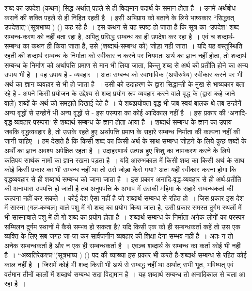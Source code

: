 शब्द का उपदेश (कथन) सिद्ध अर्थात् पहले से ही विद्यमान पदार्थ के समान होता है~। उनमें अर्थबोध करानें की शक्ति पहले से ही निहित रहती है~। इसी अभिप्राय को बताने के लिये भाष्यकार “सिद्धवत् उपदेशात्”(सूत्रभाष्य ) () कह रहे है~। इस कथन से यह स्पष्ट हो जाता है कि सूत्र का ‘उपदेश' शब्द सम्बन्ध-करण को नहीं बता रहा है, अपितु प्रसिद्ध सम्बन्ध का ही उपदेश कर रहा है~। एवं च शब्दार्थ-सम्बन्ध का कथन ही किया जाता है, उसे (शब्दार्थ-सम्बन्ध को) जोड़ा नही जाता~। यदि यह वस्तुस्थिति रहती की शब्दार्थ सम्बन्ध के निर्माता को स्वीकार न करने पर नियमतः अर्थ का ज्ञान नहीं होता, तो शब्दार्थ सम्बन्ध के निर्माण को अर्थापत्ति प्रमाण से मान भी लिया जाता, किन्तु शब्द से अर्थ की प्रतीति होने का अन्य उपाय भी है~। वह उपाय है - व्यवहार~। अतः सम्बन्ध को स्वाभाविक (अपौरुषेय) स्वीकार करने पर भी अर्थ का ज्ञान व्यवहार से भी हो जाता है~। उसी को उदाहरण के द्वारा सिद्धान्ती के मुख से भाष्यकार बता रहे है - अपने किसी प्रयोजन के उद्देश्य से शब्द प्रयोग रूप व्यवहार करने वाले वृद्ध के (द्वारा कहे जाने वाले) शब्दों के अर्थ को समझते दिखाई देते है~। ये शब्दप्रयोक्ता वृद्ध भी जब स्वयं बालक थे तब उन्होनें अन्य वृद्धों से उन्होनें भी अन्य वृद्धों से - इस परम्परा का कोई आदिकाल नहीं है~। इस प्रकार की ‘अनादि-वृद्ध-व्यवहार-परम्परा' से शब्दार्थ सम्बन्ध के ज्ञान होता आया है~। शब्दार्थ सम्बन्ध के ज्ञान का उपाय जबकि वृद्धव्यवहार है, तो उसके रहते हुए अर्थापत्ति प्रमाण के सहारे सम्बन्ध निर्माता की कल्पना नहीं की जानी चाहिए~। हम देखते है कि किसी शब्द का किसी अर्थ के साथ सम्बन्ध जोड़ने के लिये कुछ शब्दों के अर्थों का ज्ञान अवश्य अपेक्षित रहता है~। उदाहरणार्थ उत्पन्न हुए शिशु का नामकरण करने के लिये कतिपय सार्थक नामों का ज्ञान रखना पड़ता है~। यदि आरम्भकाल में किसी शब्द का किसी अर्थ के साथ कोई किसी प्रकार का भी सम्बन्ध नहीं था तो उसे जोड़ा कैसे गया? अतः यही स्वीकार करना होगा कि वृद्धव्यवहार से ही शब्दार्थ सम्बन्ध को जाना जाता है~। इस प्रकार अनादि-वृद्ध-व्यवहार से ही अर्थ-प्रतीति की अनायास उपपत्ति हो जाती है तब अनुपपत्ति के अभाव में उसकी महिमा के सहारे सम्बन्धकर्ता की कल्पना नहीं कर सकते~। कोई देश ऐसा नहीं है जो शब्दार्थ सम्बन्ध से रहित हो~। जिस प्रकार इस देश में सास्ना (गल-कम्बल) वाले पशु में गो शब्द का प्रयोग किया जाता है, उसी प्रकार समस्त दुर्गम स्थलों में भी सास्नावाले पशु में ही गो शब्द का प्रयोग होता है~। शब्दार्थ सम्बन्ध के निर्माता अनेक लोगों का परस्पर सम्मिलन दुर्गम स्थानों में कैसे सम्भव हो सकता है? यदि किसी एक को ही सम्बन्धकर्ता कहें तो उस एक व्यक्ति के लिए सब जगह जा-जा कर सार्वजनीन व्यवहार की शिक्षा देना सम्भव नहीं है~। अतः न तो अनेक सम्बन्धकर्ता है और न एक ही सम्बन्धकर्ता है~। एवञ्च शब्दार्थ के सम्बन्ध का कर्ता कोई भी नही है~। “अव्यतिरेकश्च”(सूत्रभाष्य ) () पद की व्याख्या इस प्रकार भी करते है-शब्दार्थ सम्बन्ध से रहित कोई काल नहीं है~। जिसमें कोई भी शब्द किसी भी अर्थ से सम्बद्ध नहीं था अर्थात् सभी भूत, भविष्यत् एवं वर्तमान तीनों कालों में शब्दार्थ सम्बन्ध सदा विद्यमान है~। यह शब्दार्थ सम्बन्ध तो अनादिकाल से चला आ रहा है~।

